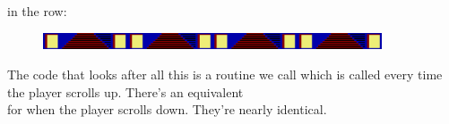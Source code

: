in the row:
\begin{figure}[H]
  {
    \setlength{\tabcolsep}{3.0pt}
    \setlength\cmidrulewidth{\heavyrulewidth} %
    \begin{adjustbox}{width=14cm,center}
          \includegraphics[width=10cm]{src/bonusphase/row_hex15.png}%
    \end{adjustbox}
  }
\end{figure}

The code that looks after all this is a routine we call 
which is called every time the player scrolls up. There's an equivalent \\
for when the player scrolls down. They're nearly identical.

